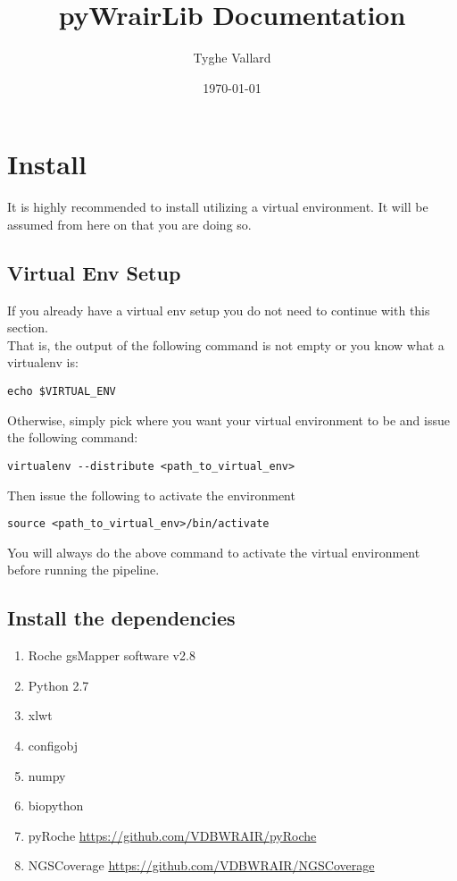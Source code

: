 \documentclass{article}
\begin{document}
\title{pyWrairLib Documentation}
\author{Tyghe Vallard}
\date{\today}
\maketitle
\tableofcontents

\pagebreak

\section{Install}
It is highly recommended to install utilizing a virtual environment. It will be assumed from here on that you are doing so.

\subsection{Virtual Env Setup}
If you already have a virtual env setup you do not need to continue with this section.\\
That is, the output of the following command is not empty or you know what a virtualenv is:
\begin{lstlisting}
echo $VIRTUAL_ENV
\end{lstlisting}
Otherwise, simply pick where you want your virtual environment to be and issue the following command:
\begin{lstlisting}
virtualenv --distribute <path_to_virtual_env>
\end{lstlisting}
Then issue the following to activate the environment
\begin{lstlisting}
source <path_to_virtual_env>/bin/activate
\end{lstlisting}
You will always do the above command to activate the virtual environment before running the pipeline.

\subsection{Install the dependencies}
\begin{enumerate}
 \item Roche gsMapper software v2.8
 \item Python 2.7
 \item xlwt
 \item configobj
 \item numpy
 \item biopython
 \item pyRoche \url{https://github.com/VDBWRAIR/pyRoche}
 \item NGSCoverage \url{https://github.com/VDBWRAIR/NGSCoverage}
\end{enumerate}
\end{document}
